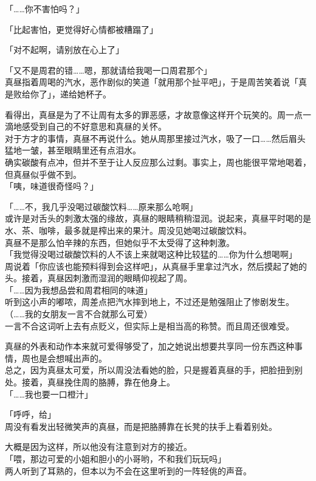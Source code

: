 「……你不害怕吗？」

「比起害怕，更觉得好心情都被糟蹋了」

「对不起啊，请别放在心上了」

「又不是周君的错……嗯，那就请给我喝一口周君那个」\\

真昼指着周喝的汽水，恶作剧似的笑道「就用那个扯平吧」，于是周苦笑着说「真是败给你了」，递给她杯子。

看得出，真昼是为了不让周有太多的罪恶感，才故意像这样开个玩笑的。周一点一滴地感受到自己的不好意思和真昼的关怀。\\

对于方才的事情，真昼不再说什么。她从周那里接过汽水，吸了一口……然后眉头猛地一皱，甚至眼睛里还有点泪水。\\

确实碳酸有点冲，但并不至于让人反应那么过剩。事实上，周也能很平常地喝着，但真昼似乎做不到。\\

「咦，味道很奇怪吗？」

「……不，我几乎没喝过碳酸饮料……原来那么呛啊」\\

或许是对舌头的刺激太强的缘故，真昼的眼睛稍稍湿润。说起来，真昼平时喝的是水、茶、咖啡，最多就是榨出来的果汁。周没见她喝过碳酸饮料。\\

真昼不是那么怕辛辣的东西，但她似乎不太受得了这种刺激。\\

「我觉得没喝过碳酸饮料的人不该上来就喝这种比较猛的……你为什么想喝啊」\\

周说着「你应该也能预料得到会这样吧」，从真昼手里拿过汽水，然后摸起了她的头。接着，真昼因刺激而湿润的眼睛仰视起了周。\\

「……因为我想品尝和周君相同的味道」\\

听到这小声的嘟哝，周差点把汽水摔到地上，不过还是勉强阻止了惨剧发生。\\

（……我的女朋友一言不合就那么可爱）\\

一言不合这词听上去有点贬义，但实际上是相当高的称赞。而且周还很难受。

真昼的外表和动作本来就可爱得够受了，加之她说出想要共享同一份东西这种事情，周也是会想喊出声的。\\

总之，因为真昼太可爱，所以周没法看她的脸，只是握着真昼的手，把脸扭到别处。接着，真昼挽住周的胳膊，靠在他身上。\\

「……我也要一口橙汁」

「呼呼，给」\\

周没有看发出轻微笑声的真昼，而是把胳膊靠在长凳的扶手上看着别处。

大概是因为这样，所以他没有注意到对方的接近。\\

「喂，那边可爱的小姐和胆小的小哥哟，不和我们玩玩吗」\\

两人听到了耳熟的，但本以为不会在这里听到的一阵轻佻的声音。
